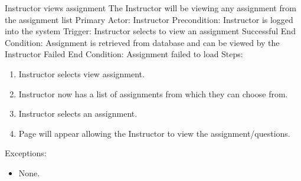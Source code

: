     \begin{section}{Instructor views assignment}
		The Instructor will be viewing any assignment from the assignment list \newline
		Primary Actor: Instructor \newline
		Precondition: Instructor is logged into the system \newline
		Trigger: Instructor selects to view an assignment \newline
		Successful End Condition: Assignment is retrieved from database and can be viewed by the Instructor\newline
		Failed End Condition: Assignment failed to load \newline
        \newline
        Steps:
        \begin{enumerate}
            \item{Instructor selects view assignment.}
            \item{Instructor now has a list of assignments from which they can choose from.}
            \item{Instructor selects an assignment.}
            \item{Page will appear allowing the Instructor to view the assignment/questions.}
        \end{enumerate}
        Exceptions:
        \begin{itemize}
            \item{None.}
        \end{itemize}
    \end{section}	
	
